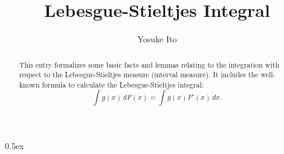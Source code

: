 \documentclass[11pt,a4paper]{article}
\begin{document}
\title{Lebesgue-Stieltjes Integral}
\author{Yosuke Ito}
\maketitle

\begin{abstract}
  This entry formalizes some basic facts and lemmas relating to the integration with respect to the Lebesgue-Stieltjes measure (interval measure). It includes the well-known formula to calculate the Lebesgue-Stieltjes integral:
  \[
    \int g(x) \, dF(x) = \int g(x) F'(x) \, dx.
  \]
\end{abstract}

\tableofcontents

\parindent 0pt\parskip 0.5ex



% 
% 
\end{document}
